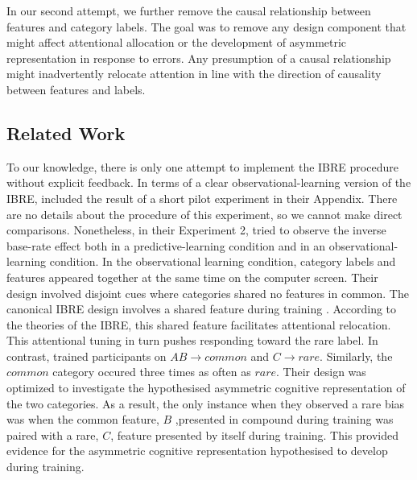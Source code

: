 \documentclass[10pt,letterpaper]{article}
\begin{document}
In our second attempt, we further remove the causal relationship between features and category labels.
The goal was to remove any design component that might affect attentional allocation or the development of asymmetric representation in response to errors.
Any presumption of a causal relationship might inadvertently relocate attention in line with the direction of causality between features and labels.

\subsection{Related Work}

To our knowledge, there is only one attempt to implement the IBRE procedure without explicit feedback.
In terms of a clear observational-learning version of the IBRE,  included the result of a short pilot experiment in their Appendix.
There are no details about the procedure of this experiment, so we cannot make direct comparisons.
Nonetheless, in their Experiment 2,  tried to observe the inverse base-rate effect both in a predictive-learning condition and in an observational-learning condition.
In the observational learning condition, category labels and features appeared together at the same time on the computer screen.
Their design involved disjoint cues where categories shared no features in common.
The canonical IBRE design involves a shared feature during training \cite{kruschke2001inverse, wills2014attention}.
According to the theories of the IBRE, this shared feature facilitates attentional relocation.
This attentional tuning in turn pushes responding toward the rare label.
In contrast,  trained participants on $AB \to common$ and $C \to rare$.
Similarly, the $common$ category occured three times as often as $rare$.
Their design was optimized to investigate the hypothesised asymmetric cognitive representation of the two categories.
As a result, the only instance when they observed a rare bias was when the common feature, $B$ ,presented in compound during training was paired with a rare, $C$, feature presented by itself during training.
This provided evidence for the asymmetric cognitive representation \cite{kruschke2001inverse} hypothesised to develop during training.
\end{document}
